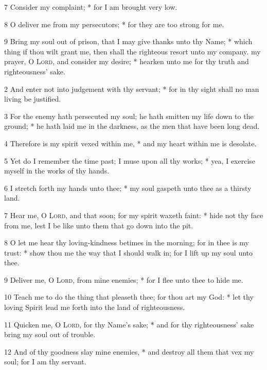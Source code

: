7 Consider my complaint; * for I am brought very low.\par
8 O deliver me from my persecutors; * for they are too strong for me.\par
9 Bring my soul out of prison, that I may give thanks unto thy Name; * which thing if thou wilt grant me, then shall the righteous resort unto my company.
 my prayer, O {\textsc{Lord}}, and consider my desire; * hearken unto me for thy truth and righteousness' sake.\par
2 And enter not into judgement with thy servant; * for in thy sight shall no man living be justified.\par
3 For the enemy hath persecuted my soul; he hath smitten my life down to the ground; * he hath laid me in the darkness, as the men that have been long dead.\par
4 Therefore is my spirit vexed within me, * and my heart within me is desolate.\par
5 Yet do I remember the time past; I muse upon all thy works; * yea, I exercise myself in the works of thy hands.\par
6 I stretch forth my hands unto thee; * my soul gaspeth unto thee as a thirsty land.\par
7 Hear me, O {\textsc{Lord}}, and that soon; for my spirit waxeth faint: * hide not thy face from me, lest I be like unto them that go down into the pit.\par
8 O let me hear thy loving-kindness betimes in the morning; for in thee is my trust: * show thou me the way that I should walk in; for I lift up my soul unto thee.\par
9 Deliver me, O {\textsc{Lord}}, from mine enemies; * for I flee unto thee to hide me.\par
10 Teach me to do the thing that pleaseth thee; for thou art my God: * let thy loving Spirit lead me forth into the land of righteousness.\par
11 Quicken me, O {\textsc{Lord}}, for thy Name's sake; * and for thy righteousness' sake bring my soul out of trouble.\par
12 And of thy goodness slay mine enemies, * and destroy all them that vex my soul; for I am thy servant.
